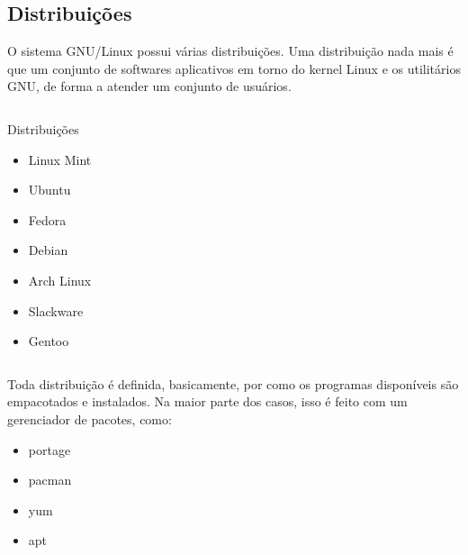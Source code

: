 \documentclass{beamer}
\begin{document}
\subsection{Distribuições}

\begin{frame}
  O sistema GNU/Linux possui várias distribuições. Uma distribuição
  nada mais é que um conjunto de softwares aplicativos em torno do
  kernel Linux e os utilitários GNU, de forma a atender um conjunto
  de usuários.

  \begin{columns}

    \begin{block}{Distribuições}
      \begin{itemize}
      \item Linux Mint
      \item Ubuntu
      \item Fedora
      \item Debian
      \item Arch Linux
      \item Slackware
      \item Gentoo
      \end{itemize}
    \end{block}

  \end{columns}

\end{frame}

\begin{frame}

  Toda distribuição é definida, basicamente, por como os programas
  disponíveis são empacotados e instalados. Na maior parte dos casos,
  isso é feito com um gerenciador de pacotes, como:

  \begin{itemize}
  \item portage
  \item pacman
  \item yum
  \item apt
  \end{itemize}

\end{frame}
\end{document}
